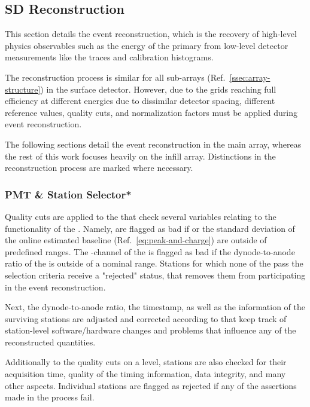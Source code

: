 \subsection{SD Reconstruction}
\label{ssec:sd-reconstruction}

This section details the event reconstruction, which is the recovery of 
high-level physics observables such as the energy of the primary \CR from 
low-level detector measurements like the \WCD \PMT traces and calibration 
histograms.

The reconstruction process is similar for all sub-arrays (Ref.\ 
\cref{ssec:array-structure}) in the surface detector. However, due to the 
grids reaching full efficiency at different energies due to dissimilar detector
spacing, different reference values, quality cuts, and normalization factors 
must be applied during event reconstruction. 

The following sections detail the event reconstruction in the  main 
array, whereas the rest of this work focuses heavily on the \SD-750 infill 
array. Distinctions in the reconstruction process are marked where necessary.

\subsubsection{PMT \& Station Selector*}
\label{sssec:reconstruction-pmt-quality-cuts}

Quality cuts are applied to the \WCD \LPMTs that check several variables 
relating to the functionality of the \PMT. Namely, \PMTs are flagged as bad if
\VemOnline or the standard deviation of the online estimated baseline (Ref.\
\cref{eq:peak-and-charge}) are outside of predefined ranges. The \LG-channel of
the \PMT is flagged as bad if the dynode-to-anode ratio of the \PMT is outside
of a nominal range. Stations for which none of the \LPMTs pass the selection 
criteria receive a "rejected" status, that removes them from participating in 
the event reconstruction.

Next, the dynode-to-anode ratio, the \TTWO timestamp, as well as the \GPS
information of the surviving stations are adjusted and corrected according to 
\LUTs that keep track of station-level software/hardware changes and problems 
that influence any of the reconstructed quantities.

Additionally to the quality cuts on a \PMT level, stations are also checked for
their acquisition time, quality of the \GPS timing information, data integrity,
and many other aspects. Individual stations are flagged as rejected if any of 
the assertions made in the process fail.

